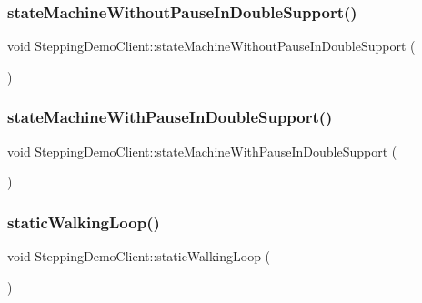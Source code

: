 \subsubsection{\texorpdfstring{state\+Machine\+Without\+Pause\+In\+Double\+Support()}{stateMachineWithoutPauseInDoubleSupport()}}
{\footnotesize\ttfamily void Stepping\+Demo\+Client\+::state\+Machine\+Without\+Pause\+In\+Double\+Support (\begin{DoxyParamCaption}{ }\end{DoxyParamCaption})\hspace{0.3cm}{\ttfamily [private]}}

\hypertarget{classSteppingDemoClient_a346a8fd10641897532a26f598db7799d}{}\label{classSteppingDemoClient_a346a8fd10641897532a26f598db7799d} 
\subsubsection{\texorpdfstring{state\+Machine\+With\+Pause\+In\+Double\+Support()}{stateMachineWithPauseInDoubleSupport()}}
{\footnotesize\ttfamily void Stepping\+Demo\+Client\+::state\+Machine\+With\+Pause\+In\+Double\+Support (\begin{DoxyParamCaption}{ }\end{DoxyParamCaption})\hspace{0.3cm}{\ttfamily [private]}}

\hypertarget{classSteppingDemoClient_a0f6b689c5f032351484b03e71a3530e1}{}\label{classSteppingDemoClient_a0f6b689c5f032351484b03e71a3530e1} 
\subsubsection{\texorpdfstring{static\+Walking\+Loop()}{staticWalkingLoop()}}
{\footnotesize\ttfamily void Stepping\+Demo\+Client\+::static\+Walking\+Loop (\begin{DoxyParamCaption}{ }\end{DoxyParamCaption})\hspace{0.3cm}{\ttfamily [private]}}



